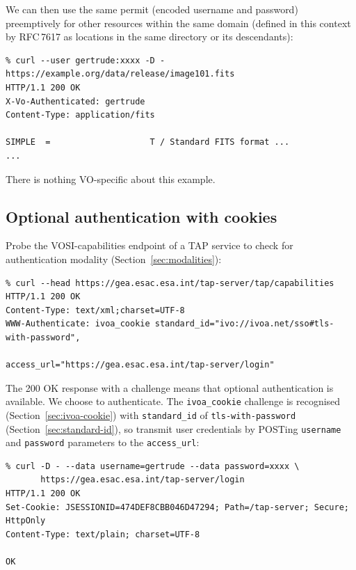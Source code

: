 \documentclass[11pt,a4paper]{ivoa}
\newcommand{\rfc}[1]{RFC\,#1}
\begin{document}
\noindent
We can then use the same permit (encoded username and password)
preemptively for other resources within the same domain
(defined in this context by \rfc{7617} as locations in the same
directory or its descendants):
{\footnotesize
\begin{verbatim}
% curl --user gertrude:xxxx -D - https://example.org/data/release/image101.fits
HTTP/1.1 200 OK
X-Vo-Authenticated: gertrude
Content-Type: application/fits

SIMPLE  =                    T / Standard FITS format ...
...
\end{verbatim}
}

There is nothing VO-specific about this example.


\subsection{Optional authentication with cookies}
\label{sec:cookie-example}


Probe the VOSI-capabilities endpoint of a TAP service to check
for authentication modality (Section~\ref{sec:modalities}):
{\footnotesize
\begin{verbatim}
% curl --head https://gea.esac.esa.int/tap-server/tap/capabilities
HTTP/1.1 200 OK
Content-Type: text/xml;charset=UTF-8
WWW-Authenticate: ivoa_cookie standard_id="ivo://ivoa.net/sso#tls-with-password",
                              access_url="https://gea.esac.esa.int/tap-server/login"
\end{verbatim}
}

\noindent
The 200 OK response with a challenge means that optional authentication
is available.
We choose to authenticate.
The \verb|ivoa_cookie| challenge is recognised (Section~\ref{sec:ivoa-cookie})
with \verb|standard_id| of \verb|tls-with-password|
(Section~\ref{sec:standard-id}),
so transmit user credentials
by POSTing \verb|username| and \verb|password| parameters
to the \verb|access_url|:
{\footnotesize
\begin{verbatim}
% curl -D - --data username=gertrude --data password=xxxx \
       https://gea.esac.esa.int/tap-server/login
HTTP/1.1 200 OK
Set-Cookie: JSESSIONID=474DEF8CBB046D47294; Path=/tap-server; Secure; HttpOnly
Content-Type: text/plain; charset=UTF-8

OK
\end{verbatim}
}
\end{document}

